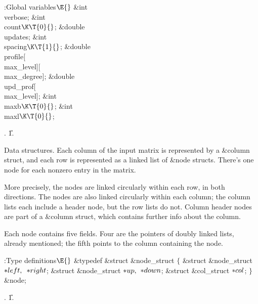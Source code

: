 \B{}:Global variables\X${}\E{}$\6
\&{int} \\{verbose};%
\6
\&{int} \\{count}${}\K\T{0}{}$;\6
\&{double} \\{updates};\6
\&{int} \\{spacing}${}\K\T{1}{}$;\6
\&{double} \\{profile}[\\{max\_level}][\\{max\_degree}];\6
\&{double} \\{upd\_prof}[\\{max\_level}];\6
\&{int} \\{maxb}${}\K\T{0}{}$;\6
\&{int} \\{maxl}${}\K\T{0}{}$;\par
{}.
\U1.\fi

Data structures.
Each column of the input matrix is represented by a \&{column} struct,
and each row is represented as a linked list of \&{node} structs. There's one
node for each nonzero entry in the matrix.

More precisely, the nodes are linked circularly within each row, in
both directions. The nodes are also linked circularly within each column;
the column lists each include a header node, but the row lists do not.
Column header nodes are part of a \&{column} struct, which
contains further info about the column.

Each node contains five fields. Four are the pointers of doubly linked lists,
already mentioned; the fifth points to the column containing the node.

\Y\B\4:Type definitions\X${}\E{}$\6
\&{typedef} \&{struct} \&{node\_struct} ${}\{{}$\1\6
\&{struct} \&{node\_struct} ${}{*}\\{left},{}$ ${}{*}\\{right}{}$;\6
\&{struct} \&{node\_struct} ${}{*}\\{up},{}$ ${}{*}\\{down}{}$;\6
\&{struct} \&{col\_struct} ${}{*}\\{col}{}$;\2\6
${}\}{}$ \&{node};\par
{}.
\U1.\fi

